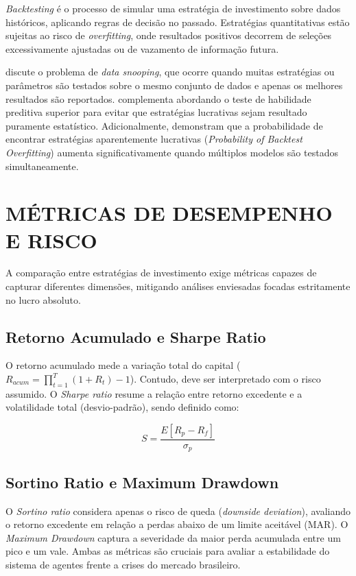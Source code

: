 \documentclass{eic-bcc-tcc}
\begin{document}
\textit{Backtesting} é o processo de simular uma estratégia de investimento sobre dados históricos, aplicando regras de decisão no passado. Estratégias quantitativas estão sujeitas ao risco de \textit{overfitting}, onde resultados positivos decorrem de seleções excessivamente ajustadas ou de vazamento de informação futura.

\citet{White2000} discute o problema de \textit{data snooping}, que ocorre quando muitas estratégias ou parâmetros são testados sobre o mesmo conjunto de dados e apenas os melhores resultados são reportados. \citet{Hansen2005} complementa abordando o teste de habilidade preditiva superior para evitar que estratégias lucrativas sejam resultado puramente estatístico. Adicionalmente, \citet{Bailey2014} demonstram que a probabilidade de encontrar estratégias aparentemente lucrativas (\textit{Probability of Backtest Overfitting}) aumenta significativamente quando múltiplos modelos são testados simultaneamente.

\section{MÉTRICAS DE DESEMPENHO E RISCO}

A comparação entre estratégias de investimento exige métricas capazes de capturar diferentes dimensões, mitigando análises enviesadas focadas estritamente no lucro absoluto.

\subsection{Retorno Acumulado e Sharpe Ratio}
O retorno acumulado mede a variação total do capital (\(R_{acum} = \prod_{t=1}^{T} (1 + R_t) - 1\)). Contudo, deve ser interpretado com o risco assumido. O \textit{Sharpe ratio} \citep{Sharpe1994, Lo2002} resume a relação entre retorno excedente e a volatilidade total (desvio-padrão), sendo definido como:

\begin{equation}
S = \frac{E[R_p - R_f]}{\sigma_p}
\end{equation}

\subsection{Sortino Ratio e Maximum Drawdown}
O \textit{Sortino ratio} \citep{Sortino1994} considera apenas o risco de queda (\textit{downside deviation}), avaliando o retorno excedente em relação a perdas abaixo de um limite aceitável (MAR). O \textit{Maximum Drawdown} \citep{Magdon2004} captura a severidade da maior perda acumulada entre um pico e um vale. Ambas as métricas são cruciais para avaliar a estabilidade do sistema de agentes frente a crises do mercado brasileiro.
\end{document}
